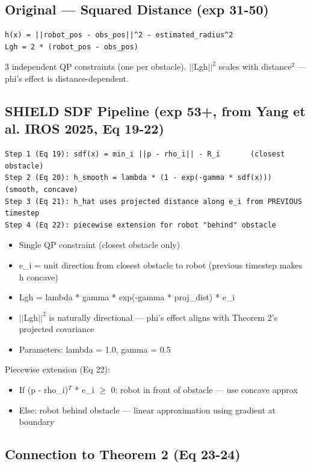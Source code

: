 \documentclass[11pt]{article}
\begin{document}
\subsection*{Original --- Squared Distance (exp 31-50)}

\begin{verbatim}
h(x) = ||robot_pos - obs_pos||^2 - estimated_radius^2
Lgh = 2 * (robot_pos - obs_pos)
\end{verbatim}

3 independent QP constraints (one per obstacle). $||$Lgh$||^2$ scales with distance$^2$ --- phi's effect is distance-dependent.


\subsection*{SHIELD SDF Pipeline (exp 53+, from Yang et al. IROS 2025, Eq 19-22)}

\begin{verbatim}
Step 1 (Eq 19): sdf(x) = min_i ||p - rho_i|| - R_i       (closest obstacle)
Step 2 (Eq 20): h_smooth = lambda * (1 - exp(-gamma * sdf(x)))  (smooth, concave)
Step 3 (Eq 21): h_hat uses projected distance along e_i from PREVIOUS timestep
Step 4 (Eq 22): piecewise extension for robot "behind" obstacle
\end{verbatim}

\begin{itemize}
\item Single QP constraint (closest obstacle only)
\item e\_i = unit direction from closest obstacle to robot (previous timestep makes h concave)
\item Lgh = lambda * gamma * exp(-gamma * proj\_dist) * e\_i
\item $||$Lgh$||^2$ is naturally directional --- phi's effect aligns with Theorem 2's projected covariance
\item Parameters: lambda = 1.0, gamma = 0.5
\end{itemize}

Piecewise extension (Eq 22):
\begin{itemize}
\item If (p - rho\_i)$^T$ * e\_i $\geq$ 0: robot in front of obstacle --- use concave approx
\item Else: robot behind obstacle --- linear approximation using gradient at boundary
\end{itemize}


\subsection*{Connection to Theorem 2 (Eq 23-24)}
\end{document}
